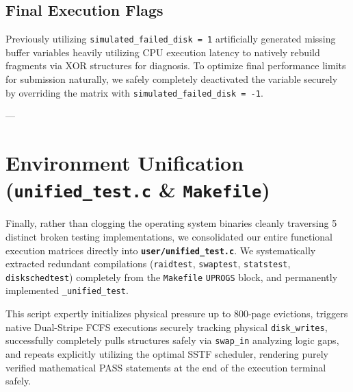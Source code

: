 \documentclass[11pt]{article}
\begin{document}
\subsection{Final Execution Flags}
Previously utilizing \texttt{simulated\_failed\_disk = 1} artificially generated missing buffer variables heavily utilizing CPU execution latency to natively rebuild fragments via XOR structures for diagnosis. To optimize final performance limits for submission naturally, we safely completely deactivated the variable securely by overriding the matrix with \texttt{simulated\_failed\_disk = -1}.

---

\section{Environment Unification (\texttt{unified\_test.c} \& \texttt{Makefile})}
Finally, rather than clogging the operating system binaries cleanly traversing 5 distinct broken testing implementations, we consolidated our entire functional execution matrices directly into \textbf{\texttt{user/unified\_test.c}}. 
We systematically extracted redundant compilations (\texttt{raidtest}, \texttt{swaptest}, \texttt{statstest}, \texttt{diskschedtest}) completely from the \texttt{Makefile} \texttt{UPROGS} block, and permanently implemented \texttt{\_unified\_test}.

This script expertly initializes physical pressure up to 800-page evictions, triggers native Dual-Stripe FCFS executions securely tracking physical \texttt{disk\_writes}, successfully completely pulls structures safely via \texttt{swap\_in} analyzing logic gaps, and repeats explicitly utilizing the optimal SSTF scheduler, rendering purely verified mathematical PASS statements at the end of the execution terminal safely.
\end{document}
